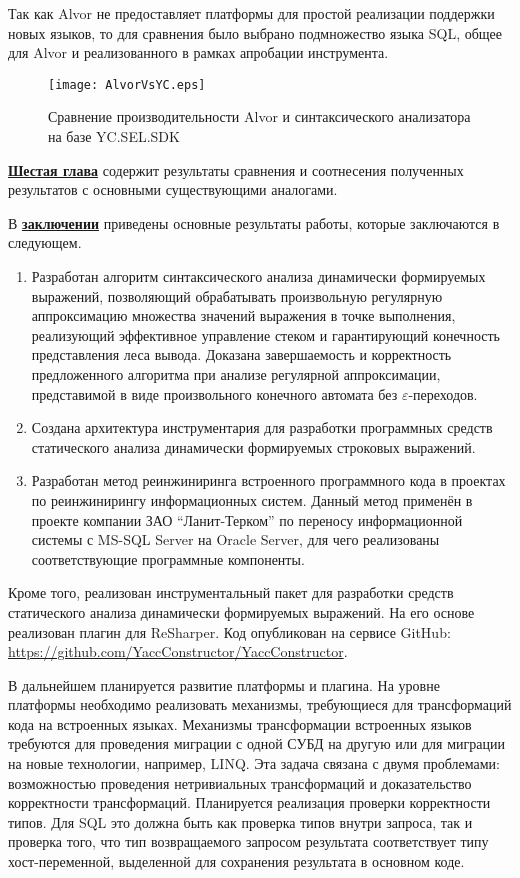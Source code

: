 Так как Alvor не предоставляет платформы для простой реализации поддержки новых языков, то для сравнения было выбрано подмножество языка SQL, общее для Alvor и реализованного в рамках апробации инструмента. 

\begin{figure}[h!]
 \centering
 \texttt{[image: AlvorVsYC.eps]}
 \caption{Сравнение производительности Alvor и синтаксического анализатора на базе YC.SEL.SDK}
 \label{fig:YCvsAlvor}
\end{figure}

\underline{\textbf{Шестая глава}} содержит результаты сравнения и соотнесения полученных результатов с основными существующими аналогами.

В \underline{\textbf{заключении}} приведены основные результаты работы, которые заключаются в следующем.
\begin{enumerate}
    \item Разработан алгоритм синтаксического анализа динамически формируемых выражений, позволяющий обрабатывать произвольную регулярную аппроксимацию множества значений выражения в точке выполнения, реализующий 
    эффективное управление стеком и гарантирующий конечность представления леса вывода. Доказана завершаемость и корректность предложенного алгоритма при анализе регулярной аппроксимации, представимой в виде произвольного конечного автомата без $\varepsilon$-переходов.
    \item Создана архитектура инструментария для разработки программных средств статического анализа динамически формируемых строковых выражений.
    \item Разработан метод реинжиниринга встроенного программного кода в проектах по реинжинирингу информационных систем. Данный метод применён в проекте компании ЗАО ``Ланит-Терком'' по переносу информационной системы с MS-SQL Server на Oracle Server, для чего реализованы соответствующие программные компоненты.
\end{enumerate}

Кроме того, реализован инструментальный пакет для разработки средств статического анализа динамически формируемых выражений. На его основе реализован плагин для ReSharper. Код опубликован на сервисе GitHub: \\ \url{https://github.com/YaccConstructor/YaccConstructor}.

В дальнейшем планируется развитие платформы и плагина. На уровне платформы необходимо реализовать механизмы, требующиеся для трансформаций кода на встроенных языках. Механизмы трансформации встроенных языков требуются для проведения миграции с одной СУБД на другую или для миграции на новые технологии, например, LINQ. Эта задача связана с двумя проблемами: возможностью проведения нетривиальных трансформаций и доказательство корректности трансформаций. Планируется реализация проверки корректности типов. Для SQL это должна быть как проверка типов внутри запроса, так и проверка того, что тип возвращаемого запросом результата соответствует типу хост-переменной, выделенной для сохранения результата в основном коде.

